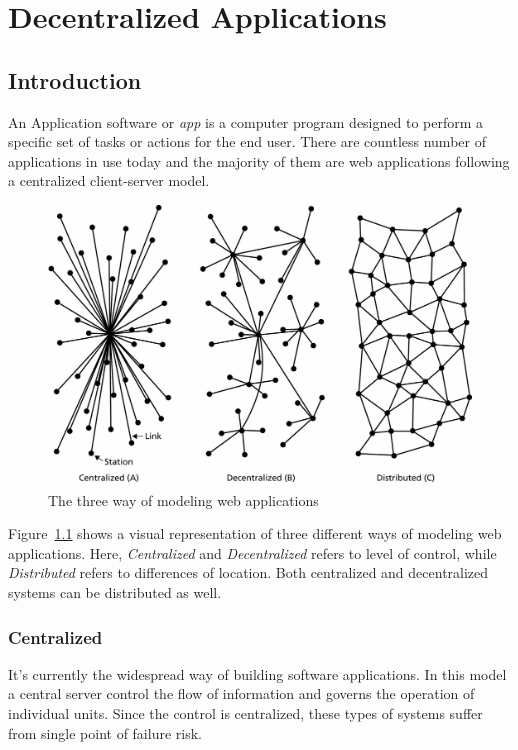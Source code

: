 \chapter{Decentralized Applications}\label{chapter::decentralizedapps}

	\section{Introduction}
	An Application software or \textit{app} is a computer program designed to perform a specific set of tasks or actions for the end user. There are countless number of applications in use today and the majority of them are web applications following a centralized client-server model\cite{raval2016decentralized}.
	
	\begin{figure}[h]
		\includegraphics[width=\linewidth]{figures/network-models}
		\caption{\label{fig:applications} The three way of modeling web applications}
	\end{figure}
	
	Figure~\ref{fig:applications} shows a visual representation of three different ways of modeling web applications\cite{baran1964distributed}. Here, \textit{Centralized} and \textit{Decentralized} refers to level of control, while \textit{Distributed} refers to differences of location. Both centralized and decentralized systems can be distributed as well.
	
	\subsection{Centralized}
	It's currently the widespread way of building software applications. In this model a central server control the flow of information and governs the operation of individual units. Since the control is centralized, these types of systems suffer from single point of failure risk.
	
